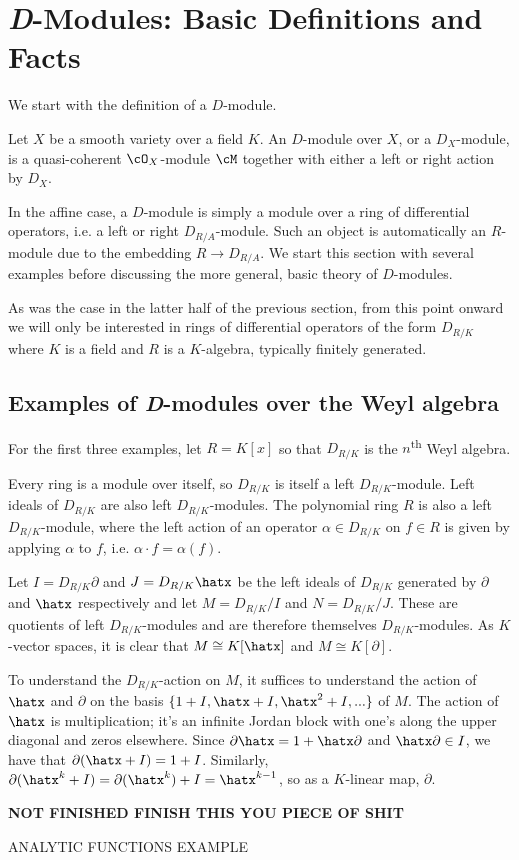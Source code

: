\section{\textit{D}-Modules: Basic Definitions and Facts}
We start with the definition of a $D$-module.
\begin{defn}\label{defn:D-mod}
	Let $X$ be a smooth variety over a field $K$. An $D$-module over $X$, or a $D_X$-module, is a quasi-coherent $\cO_X$-module $\cM$ together with either a left or right action by $D_X$.
\end{defn}
In the affine case, a $D$-module is simply a module over a ring of differential operators, i.e. a left or right $D_{R/A}$-module. Such an object is automatically an $R$-module due to the embedding $R\to D_{R/A}$. We start this section with several examples before discussing the more general, basic theory of $D$-modules.

As was the case in the latter half of the previous section, from this point onward we will only be interested in rings of differential operators of the form $D_{R/K}$ where $K$ is a field and $R$ is a $K$-algebra, typically finitely generated. 
\subsection{Examples of \emph{D}-modules over the Weyl algebra}
For the first three examples, let $R = K[x]$ so that $D_{R/K}$ is the $n$\textsuperscript{th} Weyl algebra.
\begin{example}\label{example:Weyl-algebra-is-D-mod}
	Every ring is a module over itself, so $D_{R/K}$ is itself a left $D_{R/K}$-module. Left ideals of $D_{R/K}$ are also left $D_{R/K}$-modules. The polynomial ring $R$ is also a left $D_{R/K}$-module, where the left action of an operator $\alpha \in D_{R/K}$ on $f \in R$ is given by applying $\alpha$ to $f$, i.e. $\alpha\cdot f = \alpha(f)$.
\end{example}
\begin{example}\label{example:quotient-by-x-and-partial}
	Let $I = D_{R/K}\partial$ and $J = D_{R/K}\hatx$ be the left ideals of $D_{R/K}$ generated by $\partial$ and $\hatx$ respectively and let $M = D_{R/K}/I$ and $N = D_{R/K}/J$. These are quotients of left $D_{R/K}$-modules and are therefore themselves $D_{R/K}$-modules. As $K$-vector spaces, it is clear that $M \cong K[\hatx]$ and $M \cong K[\partial]$.

	To understand the $D_{R/K}$-action on $M$, it suffices to understand the action of $\hatx$ and $\partial$ on the basis $\{1+I,\hatx + I,\hatx^2 + I,...\}$ of $M$. The action of $\hatx$ is multiplication; it's an infinite Jordan block with one's along the upper diagonal and zeros elsewhere. Since $\partial\hatx = 1 + \hatx\partial$ and $\hatx\partial \in I$, we have that $\partial(\hatx + I) = 1 + I$. Similarly, $\partial(\hatx^k + I) = \partial(\hatx^k) + I = \hatx^{k-1}$, so as a $K$-linear map, $\partial$.

	\textbf{NOT FINISHED FINISH THIS YOU PIECE OF SHIT}
\end{example}
\begin{example}\label{example:analytic-functions}
	ANALYTIC FUNCTIONS EXAMPLE
\end{example}

